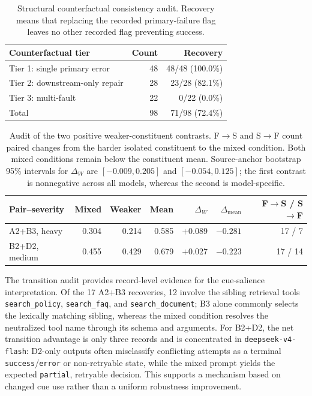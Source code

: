 \documentclass[11pt]{article}
\begin{document}
\begin{table}[htbp]
\centering
\small
\begin{tabular}{lrr}
\toprule
Counterfactual tier & Count & Recovery \\
\midrule
Tier 1: single primary error & 48 & 48/48 (100.0\%) \\
Tier 2: downstream-only repair & 28 & 23/28 (82.1\%) \\
Tier 3: multi-fault & 22 & 0/22 (0.0\%) \\
\midrule
Total & 98 & 71/98 (72.4\%) \\
\bottomrule
\end{tabular}
\caption{Structural counterfactual consistency audit. Recovery means that replacing the recorded primary-failure flag leaves no other recorded flag preventing success.}
\label{tab:counterfactual-attribution}
\end{table}

\begin{table}[htbp]
\centering
\small
\setlength{\tabcolsep}{5pt}
\begin{tabular}{lrrrrrr}
\toprule
Pair--severity & Mixed & Weaker & Mean & $\Delta_W$ & $\Delta_{\mathrm{mean}}$ & F$\rightarrow$S / S$\rightarrow$F \\
\midrule
A2+B3, heavy & 0.304 & 0.214 & 0.585 & $+0.089$ & $-0.281$ & 17 / 7 \\
B2+D2, medium & 0.455 & 0.429 & 0.679 & $+0.027$ & $-0.223$ & 17 / 14 \\
\bottomrule
\end{tabular}
\caption{Audit of the two positive weaker-constituent contrasts. F$\rightarrow$S and S$\rightarrow$F count paired changes from the harder isolated constituent to the mixed condition. Both mixed conditions remain below the constituent mean. Source-anchor bootstrap 95\% intervals for $\Delta_W$ are $[-0.009, 0.205]$ and $[-0.054, 0.125]$; the first contrast is nonnegative across all models, whereas the second is model-specific.}
\label{tab:positive-mixed-audit}
\end{table}

The transition audit provides record-level evidence for the cue-salience interpretation. Of the 17 A2+B3 recoveries, 12 involve the sibling retrieval tools \texttt{search\_policy}, \texttt{search\_faq}, and \texttt{search\_document}; B3 alone commonly selects the lexically matching sibling, whereas the mixed condition resolves the neutralized tool name through its schema and arguments. For B2+D2, the net transition advantage is only three records and is concentrated in \texttt{deepseek-v4-flash}: D2-only outputs often misclassify conflicting attempts as a terminal \texttt{success}/\texttt{error} or non-retryable state, while the mixed prompt yields the expected \texttt{partial}, retryable decision. This supports a mechanism based on changed cue use rather than a uniform robustness improvement.
\end{document}
